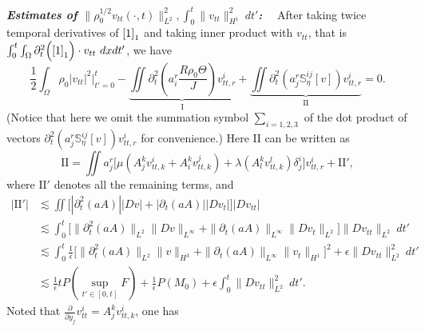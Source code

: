 \documentclass[12pt,a4paper]{amsart}
\numberwithin{equation}{section}
\theoremstyle{plain}
\theoremstyle{definition}
\begin{document}
\vspace{0.3cm}
\textsl{\textbf{Estimates of $\|\rho_0^{1/2}v_{tt}(\cdot,t)\|_{L^2}^2, \int_{0}^{t}\|v_{tt}\|_{H^1}^2 \ dt'$:}}~~
After taking twice temporal derivatives of $\eqref{1}_1$ and taking inner product with $v_{tt}$, that is $\int_{0}^{t}\int_{\Omega}\partial_t^2 \Big(\eqref{1}_1\Big)\cdot  v_{tt} \ dx dt'$, we have 
$$
\frac{1}{2}\int_{\Omega} \rho_0 |v_{tt}|^2 \bigg|_{t'=0}^{t}  
-\underbrace{\iint  \partial_t^2 (a^r_i\frac{R\rho_0\Theta}{J}) v^i_{tt,r}}_{\mathrm{I}}
+\underbrace{\iint \partial_t^2 (a^r_j\mathbb{S}^{ij}_{\eta}[v]) v^i_{tt,r}}_{\mathrm{II}}=0.
$$
(Notice that here we omit the summation symbol $\sum\limits_{i=1,2,3}$ of the dot product of vectors $ \partial_t^2 (a^r_j\mathbb{S}^{ij}_{\eta}[v]) v^i_{tt,r}$ for convenience.)
Here $\mathrm{II}$ can be written as
$$
\mathrm{II}=\iint a^r_j\Big[\mu (A^{k}_j  v^i_{tt,k}+A^k_i  v^j_{tt,k})+\lambda (A_l^k  v^l_{tt,k})\delta^i_j\Big] v^i_{tt,r}+\mathrm{II}',
$$
where $\mathrm{II}'$ denotes all the remaining terms, and
\begin{align*}
|\mathrm{II}'|&\lesssim  \iint \Big[|\partial_t^2(aA)| |Dv|
   +|\partial_t (aA)| |Dv_t|\Big]|Dv_{tt}|\\
&\lesssim  \int_{0}^{t} \Big[\|\partial_t^2(aA)\|_{L^2} \|Dv\|_{L^{\infty}}
   +\|\partial_t (aA)\|_{L^{\infty}} \|Dv_t\|_{L^2}\Big]\|Dv_{tt}\|_{L^2}\ dt'\\
&\lesssim \int_{0}^{t}\frac{1}{\epsilon}
   \Big[\|\partial_t^2(aA)\|_{L^2} \|v\|_{H^3}
      +\|\partial_t (aA)\|_{L^{\infty}} \|v_t\|_{H^1}\big]^2
   +\epsilon \|Dv_{tt}\|_{L^2}^2\ dt'\\
&\lesssim\frac{1}{\epsilon} tP(\sup\limits_{t'\in[0,t]} F)+\frac{1}{\epsilon}P(M_0)
   + \epsilon\int_{0}^{t} \|Dv_{tt}\|_{L^2}^2\ dt'.
\end{align*}
Noted that $\frac{\partial}{\partial y_j} v_{tt}^i=A_j^k v^i_{tt,k}$, one has 
\end{document}
